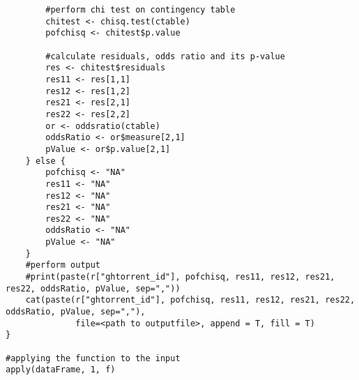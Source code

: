 \begin{appendices}
\begin{scriptsize}
\begin{verbatim}
        #perform chi test on contingency table
        chitest <- chisq.test(ctable)
        pofchisq <- chitest$p.value
        
        #calculate residuals, odds ratio and its p-value
        res <- chitest$residuals
        res11 <- res[1,1]
        res12 <- res[1,2]
        res21 <- res[2,1]
        res22 <- res[2,2]
        or <- oddsratio(ctable)
        oddsRatio <- or$measure[2,1]
        pValue <- or$p.value[2,1]    
    } else {
        pofchisq <- "NA"
        res11 <- "NA"
        res12 <- "NA"
        res21 <- "NA"
        res22 <- "NA"
        oddsRatio <- "NA"
        pValue <- "NA"
    }
    #perform output
    #print(paste(r["ghtorrent_id"], pofchisq, res11, res12, res21, res22, oddsRatio, pValue, sep=","))
    cat(paste(r["ghtorrent_id"], pofchisq, res11, res12, res21, res22, oddsRatio, pValue, sep=","), 
              file=<path to outputfile>, append = T, fill = T)
}

#applying the function to the input
apply(dataFrame, 1, f)

\end{verbatim}
\end{scriptsize}
\end{appendices}
